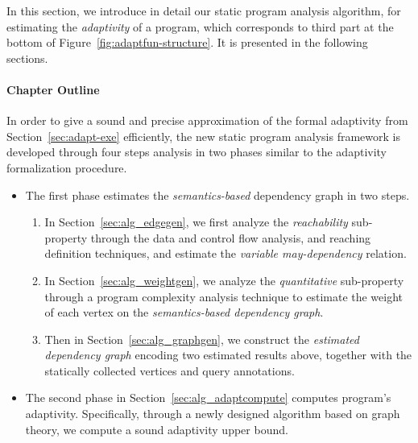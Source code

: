 In this section, we introduce in detail our static
program analysis algorithm, {\THESYSTEM} for estimating the \emph{adaptivity} of a program,
which corresponds to
third part at the bottom of Figure~\ref{fig:adaptfun-structure}. 
It is presented in the following sections.

\paragraph{{Chapter Outline}}
%
In order to give a sound and precise approximation of the formal adaptivity from Section~\ref{sec:adapt-exe} efficiently, 
the new static program analysis framework is developed through four steps analysis in two phases
similar to the adaptivity formalization procedure.
\begin{itemize}
 \item The first phase estimates the \emph{semantics-based} dependency graph in two steps.
 \begin{enumerate}
 \item In Section~\ref{sec:alg_edgegen}, we first analyze the \emph{reachability} sub-property
 through the data and control flow analysis, and reaching definition techniques, and estimate the
 \emph{variable may-dependency} relation.
 \item In Section~\ref{sec:alg_weightgen}, we analyze the \emph{quantitative} sub-property
 through
 a program complexity analysis technique to estimate the weight of each vertex on the \emph{semantics-based dependency graph}.
 \item Then in Section~\ref{sec:alg_graphgen}, we construct the \emph{estimated dependency graph} encoding two estimated results above, together with the statically collected vertices and query annotations.
 \end{enumerate}
 \item The second phase in Section~\ref{sec:alg_adaptcompute} computes program's adaptivity.
 Specifically, through a newly designed algorithm based on graph theory,
 we compute a sound adaptivity upper bound.
 \end{itemize}